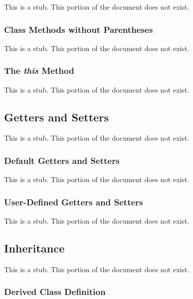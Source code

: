 This is a stub.  This portion of the document does not exist.

\subsubsection{Class Methods without Parentheses}
\label{Class_Methods_without_Parentheses}

This is a stub.  This portion of the document does not exist.

\subsubsection{The {\em this} Method}
\label{The_em_this_Method}

This is a stub.  This portion of the document does not exist.

\subsection{Getters and Setters}
\label{Getters_and_Setters}

This is a stub.  This portion of the document does not exist.

\subsubsection{Default Getters and Setters}
\label{Default_Getters_and_Setters}

This is a stub.  This portion of the document does not exist.

\subsubsection{User-Defined Getters and Setters}
\label{User-Defined_Getters_and_Setters}

This is a stub.  This portion of the document does not exist.

\subsection{Inheritance}
\label{Inheritance}

This is a stub.  This portion of the document does not exist.

\subsubsection{Derived Class Definition}
\label{Derived_Class_Definition}

